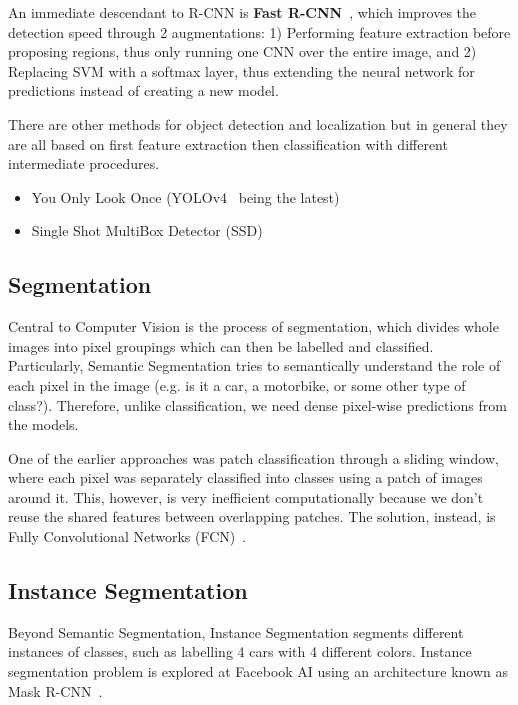 An immediate descendant to R-CNN is \textbf{Fast
    R-CNN}~\cite{DBLP:journals/corr/Girshick15}, which improves the detection
speed through 2 augmentations: 1) Performing feature extraction before
proposing regions, thus only running one CNN over the entire image, and 2)
Replacing SVM with a softmax layer, thus extending the neural network for
predictions instead of creating a new model.

There are other methods for object detection and localization but in general
they are all based on first feature extraction then classification with
different intermediate procedures.

\begin{itemize}
    \item You Only Look Once (YOLOv4~\cite{Bochkovskiy2020YOLOv4OS} being the latest)
    \item Single Shot MultiBox Detector (SSD)~\cite{DBLP:journals/corr/LiuAESR15}
\end{itemize}

\subsection{Segmentation}
Central to Computer Vision is the process of segmentation, which divides whole
images into pixel groupings which can then be labelled and classified.
Particularly, Semantic Segmentation tries to semantically understand the role of
each pixel in the image (e.g. is it a car, a motorbike, or some other type of
class?). Therefore, unlike classification, we need dense pixel-wise predictions
from the models.

One of the earlier approaches was patch classification through a sliding window,
where each pixel was separately classified into classes using a patch of images
around it. This, however, is very inefficient computationally because we don’t
reuse the shared features between overlapping patches. The solution, instead, is
Fully Convolutional Networks (FCN)~\cite{DBLP:journals/corr/LongSD14}.

\subsection{Instance Segmentation}
Beyond Semantic Segmentation, Instance Segmentation segments different instances
of classes, such as labelling 4 cars with 4 different colors. Instance
segmentation problem is explored at Facebook AI using an architecture known as
Mask R-CNN~\cite{DBLP:journals/corr/HeGDG17}. 

